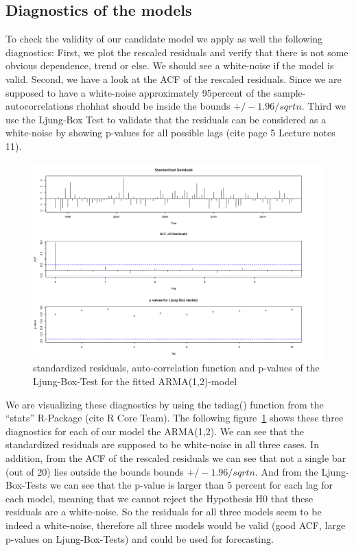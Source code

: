 \documentclass[11pt,a4paper]{article}
\begin{document}
\subsection{Diagnostics of the models}
To check the validity of our candidate model we apply as well the following diagnostics: First, we plot the rescaled residuals and verify that there is not some obvious dependence, trend or else. We should see a white-noise if the model is valid. Second, we have a look at the ACF of the rescaled residuals. Since we are supposed to have a white-noise approximately 95percent of the sample-autocorrelations rhohhat should be inside the bounds $+/-1.96/sqrt{n}$. Third we use the Ljung-Box Test \citep{LjungBox78} to validate that the residuals can be considered as a white-noise by showing p-values for all possible lags (cite page 5 Lecture notes 11). \\
\begin{figure}[!htb]
\centering
\includegraphics[angle=0,
width=1\textwidth]{tsdiag_arma_1_2}
\caption{standardized residuals, auto-correlation function and p-values of the Ljung-Box-Test for the fitted ARMA(1,2)-model
\label{fig:tsdiag_arma_1_2}}
\end{figure}
We are visualizing these diagnostics by using the tsdiag() function from the “stats” R-Package (cite R Core Team). The following figure~\ref{fig:tsdiag_arma_1_2} shows these three diagnostics for each of our model the ARMA(1,2). We can see that the standardized residuals are supposed to be white-noise in all three cases. In addition, from the ACF of the rescaled residuals we can see that not a single bar (out of 20) lies outside the bounds bounds $+/-1.96/sqrt{n}$. And from the Ljung-Box-Tests we can see that the p-value is larger than 5 percent for each lag for each model, meaning that we cannot reject the Hypothesis H0 that these residuals are a white-noise. So the residuals for all three models seem to be indeed a white-noise, therefore all three models would be valid (good ACF, large p-values on Ljung-Box-Tests) and could be used for forecasting. \\
\end{document}

